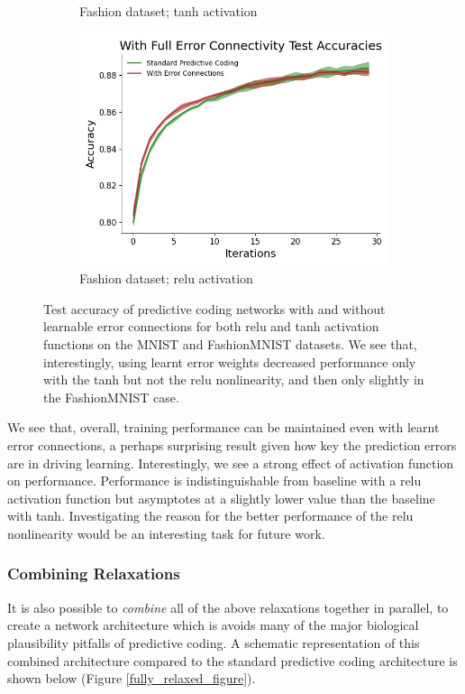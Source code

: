 \begin{figure}[ht]
\begin{subfigure}[b]{0.5\linewidth}
 \caption{\small Fashion dataset; tanh activation} 
 \end{subfigure}%
 \begin{subfigure}[b]{0.5\linewidth}
 \centering
 \includegraphics[width=0.75\linewidth]{chapter_3_figures/fashion_relu_With_Full_Error_Connectivity_Test_Accuracies_prelim_2.jpg} 
 \caption{\small Fashion dataset; relu activation} 
 \end{subfigure} 
 \caption{Test accuracy of predictive coding networks with and without learnable error connections for both relu and tanh activation functions on the MNIST and FashionMNIST datasets. We see that, interestingly, using learnt error weights decreased performance only with the tanh but not the relu nonlinearity, and then only slightly in the FashionMNIST case.}
 
\label{learning_error_weights}
\end{figure} 
We see that, overall, training performance can be maintained even with learnt error connections, a perhaps surprising result given how key the prediction errors are in driving learning. Interestingly, we see a strong effect of activation function on performance. Performance is indistinguishable from baseline with a relu activation function but asymptotes at a slightly lower value than the baseline with tanh. Investigating the reason for the better performance of the relu nonlinearity would be an interesting task for future work.

\subsubsection{Combining Relaxations}

It is also possible to \emph{combine} all of the above relaxations together in parallel, to create a network architecture which is avoids many of the major biological plausibility pitfalls of predictive coding. A schematic representation of this combined architecture compared to the standard predictive coding architecture is shown below (Figure \ref{fully_relaxed_figure}).

